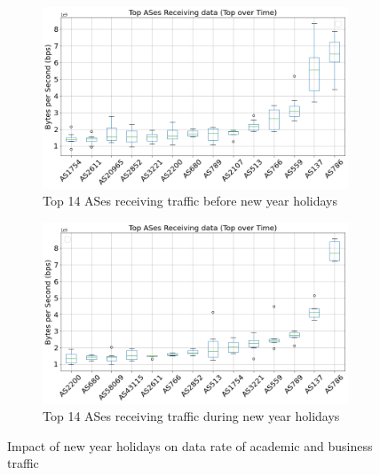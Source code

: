 \documentclass[10pt, journal, letterpaper]{IEEEtran}
\newcommand\figSzeMahdi{0.8}
\begin{document}
\begin{figure}[hbt!]
    \centering
    \begin{subfigure}{\figSzeMahdi\columnwidth}
          \centering
          \includegraphics[width=\columnwidth]{img/BCH2_top14AS_recieving_bps.png}
          \caption{Top 14 ASes receiving traffic before new year holidays}
          \label{fig:BCH2_topAS_rec_bps}
    \end{subfigure}
    \begin{subfigure}{\figSzeMahdi\columnwidth}
          \centering
          \includegraphics[width=\columnwidth]{img/CH2_top14AS_recieving_bps.png}
          \caption{Top 14 ASes receiving traffic during new year holidays}
          \label{fig:CH2_topAS_rec_bps}
    \end{subfigure}
    \caption{Impact of new year holidays on data rate of academic and business traffic}
    \label{fig:topAS_rec_BCH_CH}
\end{figure}
\end{document}
